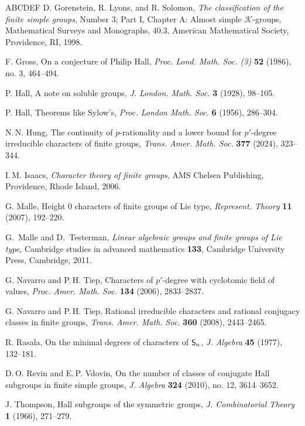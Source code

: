 \documentclass[12pt]{amsart}
\theoremstyle{definition}
\numberwithin{equation}{section}
\newcommand{\Sy}{\textup{\textsf{S}}}
\begin{document}
\begin{thebibliography}{ABCDEF}
D. Gorenstein, R. Lyons, and R. Solomon, \emph{The classification of
the finite simple groups}, Number 3; Part I, Chapter A: Almost
simple $\mathcal{K}$-groups, Mathematical Surveys and Monographs,
40.3, American Mathematical Society, Providence, RI, 1998.

F. Gross, On a conjecture of Philip Hall, \emph{Proc. Lond. Math.
Soc. (3)} \textbf{52} (1986), no. 3, 464--494.

{P. Hall}, A note on soluble groups,
\emph{J. London. Math. Soc.} \textbf{3} (1928), 98--105.

{P. Hall}, Theorems like Sylow's,
\emph{Proc. London Math. Soc.} \textbf{6} (1956), 286--304.



{N.\,N. Hung}, The continuity of $p$-rationality and a lower bound
for $p'$-degree irreducible characters of finite groups,
\emph{Trans. Amer. Math. Soc.} \textbf{377} (2024), 323--344.

I.\,M. Isaacs, {\it Character theory of finite groups}, AMS Chelsea
Publishing, Providence, Rhode Island, 2006.

G. Malle, Height 0 characters of finite groups of Lie type,
\emph{Represent. Theory} \textbf{11} (2007), 192--220.

G.~Malle and D.~Testerman, \emph{Linear algebraic groups and finite
 groups of Lie type}, Cambridge studies in advanced mathematics
\textbf{133}, Cambridge University Press, Cambridge, 2011.


G. Navarro and P.\,H. Tiep, Characters of $p'$-degree with
cyclotomic field of values, \emph{Proc. Amer. Math. Soc.}
\textbf{134} (2006), 2833--2837.

 G. Navarro and P.\,H. Tiep, Rational irreducible
 characters and rational conjugacy classes in finite groups,
 \emph{Trans. Amer. Math. Soc.}
 \textbf{360} (2008), 2443--2465.

R. Rasala, On the minimal degrees of characters of $\Sy_n$, \emph{J.
Algebra} \textbf{45} (1977), 132--181.

D.\,O. Revin and E.\,P. Vdovin, On the number of classes of
conjugate Hall subgroups in finite simple groups, \emph{J. Algebra}
\textbf{324} (2010), no. 12, 3614--3652.



J. Thompson, Hall subgroups of the symmetric groups,
\emph{J. Combinatorial Theory} \textbf{1} (1966), 271--279.

\end{thebibliography}
\end{document}
